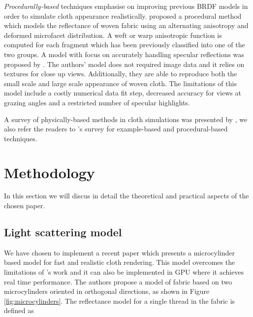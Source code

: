 \documentclass[12pt]{article}
\begin{document}
\emph{Procedurally-based} techniques emphasise on improving previous BRDF models in order to simulate cloth appearance realistically.
\citeauthor{Kang2010} \cite{Kang2010} proposed a procedural method which models the reflectance of woven fabric using an alternating anisotropy and deformed microfacet distribution.
A weft or warp anisotropic function is computed for each fragment which has been previously classified into one of the two groups.
A model with focus on accurately handling specular reflections was proposed by \citeauthor{Irawan2012} \cite{Irawan2012}.
The authors' model does not required image data and it relies on textures for close up views.
Additionally, they are able to reproduce both the small scale and large scale appearance of woven cloth.
The limitations of this model include a costly numerical data fit step, decreased accuracy for views at grazing angles and a restricted number of specular highlights.

A survey of physically-based methods in cloth simulations was presented by \citeauthor{Schroder2012} \cite{Schroder2012}, we also refer the readers to \citeauthor{Yuen2011}'s \cite{Yuen2011} survey for example-based and procedural-based techniques.

\section{Methodology}

In this section we will discus in detail the theoretical and practical aspects of the chosen paper.

\subsection{Light scattering model}
\label{sec:light_scattering_model}
We have chosen to implement a recent paper \cite{Sadeghi2013} which presents a microcylinder based model for fast and realistic cloth rendering.
This model overcomes the limitations of \citeauthor{Irawan2012}'s work \cite{Irawan2012} and it can also be implemented in GPU where it achieves real time performance.
The authors propose a model of fabric based on two microcylinders oriented in orthogonal directions, as shown in Figure \ref{fig:microcylinders}.
The reflectance model for a single thread in the fabric is defined as
\end{document}
